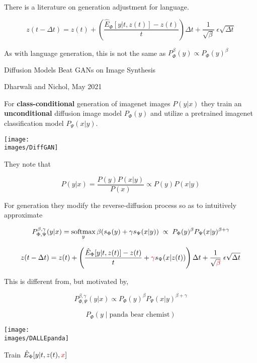 {\vfill
There is a literature on generation adjustment for language.


{\huge

$$z(t - \Delta t) = z(t) + \left(\frac{\hat{E}_\Phi[y|t,z(t)] - z(t)}{t}\right)\Delta t + \frac{1}{\sqrt{\beta}}\;\epsilon\sqrt{\Delta t}$$

\vfill
As with language generation, this is not the same as $P^\beta_\Phi(y) \propto P_\Phi(y)^\beta$
}


\centerline{Diffusion Models Beat GANs on Image Synthesis}
\centerline{Dharwali and Nichol, May 2021}

\vfill
For {\bf class-conditional} generation of imagenet images $P(y|x)$ they train an {\bf unconditional} diffusion image model $P_\Phi(y)$
and utilize a pretrained imagenet classification model $P_\Psi(x|y)$.

\vfill
\centerline{\texttt{[image: \\images/DiffGAN]}}


They note that

\vfill
$$P(y|x) = \frac{P(y)P(x|y)}{P(x)} \propto P(y)P(x|y)$$

\vfill
For generation they modify the reverse-diffusion process so as to intuitively approximate

$$P^{\beta,\gamma}_{\Phi,\Psi}(y|x) = \operatorname*{softmax}_y \beta(s_\Phi(y)+ \gamma s_\Psi(x|y)) \; \propto \;P_\Phi(y)^\beta P_\Psi(x|y)^{\beta + \gamma}$$


{\huge $$z(t - \Delta t) = z(t) + \left(\frac{\hat{E}_\Phi[y|t,z(t)] - z(t)}{t} + {\color{red} \gamma} s_\Psi(x|z(t))\right)\Delta t
+ \frac{1}{\sqrt{\color{red} \beta}}\;\epsilon\sqrt{\Delta t}$$}

\vfill
This is different from, but motivated by,

\vfill
$$P^{\beta,\gamma}_{\Phi,\Psi}(y|x) \propto P_\Phi(y)^\beta P_\Psi(x|y)^{\beta + \gamma}$$


$$P_\Phi(y\;|\;\mbox{panda bear chemist})$$

\vfill
\centerline{\texttt{[image: \\images/DALLEpanda]}}

\vfill
\centerline {Train $\hat{E}_\Phi[y|t,z(t),{\color{red} x}]$}

}
